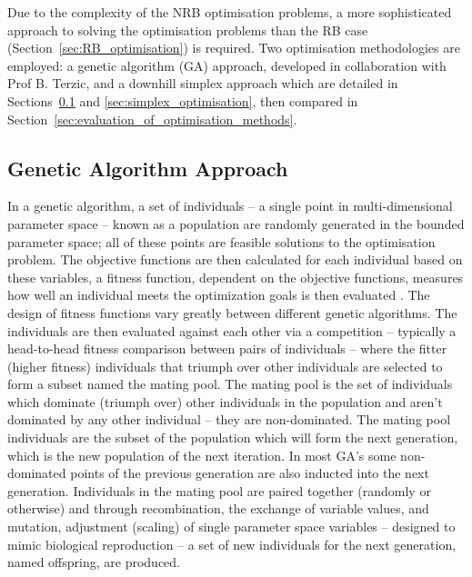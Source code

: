 \documentclass[../main.tex]{subfiles}
\begin{document}
Due to the complexity of the NRB optimisation problems, a more sophisticated approach to solving the optimisation problems than the RB case (Section~\ref{sec:RB_optimisation}) is required. Two optimisation methodologies are employed: a genetic algorithm (GA) approach, developed in collaboration with Prof B. Terzic, and a downhill simplex approach which are detailed in Sections~\ref{sec:genetic_algorithm_optimisation} and \ref{sec:simplex_optimisation}, then compared in Section~\ref{sec:evaluation_of_optimisation_methods}.

\subsection{Genetic Algorithm Approach}
\label{sec:genetic_algorithm_optimisation}
In a genetic algorithm, a set of individuals -- a single point in multi-dimensional parameter space -- known as a population are randomly generated in the bounded parameter space; all of these points are feasible solutions to the optimisation problem. The objective functions are then calculated for each individual based on these variables, a fitness function, dependent on the objective functions, measures how well an individual meets the optimization goals \cite{hofler2013innovative} is then evaluated . The design of fitness functions vary greatly between different genetic algorithms. The individuals are then evaluated against each other via a competition -- typically a head-to-head fitness comparison between pairs of individuals -- where the fitter (higher fitness) individuals that triumph over other individuals are selected to form a subset named the mating pool. The mating pool is the set of individuals which dominate (triumph over) other individuals in the population and aren't dominated by any other individual -- they are non-dominated. The mating pool individuals are the subset of the population which will form the next generation, which is the new population of the next iteration. In most GA's some non-dominated points of the previous generation are also inducted into the next generation. Individuals in the mating pool are paired together (randomly or otherwise) and through recombination, the exchange of variable values, and mutation, adjustment (scaling) of single parameter space variables \cite{hofler2013innovative} -- designed to mimic biological reproduction -- a set of new individuals for the next generation, named offspring, are produced.
\end{document}
